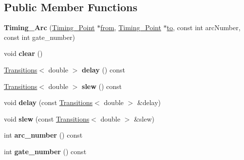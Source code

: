\subsection*{Public Member Functions}
\begin{DoxyCompactItemize}
\item 
\hypertarget{classTiming__Analysis_1_1Timing__Arc_a38312efc7070c651743a667568514162}{{\bfseries Timing\-\_\-\-Arc} (\hyperlink{classTiming__Analysis_1_1Timing__Point}{Timing\-\_\-\-Point} $\ast$\hyperlink{classTiming__Analysis_1_1Edge_a47020ea89fd9fde438adc814a731a23d}{from}, \hyperlink{classTiming__Analysis_1_1Timing__Point}{Timing\-\_\-\-Point} $\ast$\hyperlink{classTiming__Analysis_1_1Single__Fanout__Edge_ac01deccce158b6cee6883924e6dcb788}{to}, const int arc\-Number, const int gate\-\_\-number)}\label{classTiming__Analysis_1_1Timing__Arc_a38312efc7070c651743a667568514162}

\item 
\hypertarget{classTiming__Analysis_1_1Timing__Arc_a092de659dd0846a3e899f0efd9c34397}{void {\bfseries clear} ()}\label{classTiming__Analysis_1_1Timing__Arc_a092de659dd0846a3e899f0efd9c34397}

\item 
\hypertarget{classTiming__Analysis_1_1Timing__Arc_a6561e6eb77cc7536f5515db318b233ce}{\hyperlink{classTransitions}{Transitions}$<$ double $>$ {\bfseries delay} () const }\label{classTiming__Analysis_1_1Timing__Arc_a6561e6eb77cc7536f5515db318b233ce}

\item 
\hypertarget{classTiming__Analysis_1_1Timing__Arc_a9846eb6bd9afc2cd8cbb0f926daf39a5}{\hyperlink{classTransitions}{Transitions}$<$ double $>$ {\bfseries slew} () const }\label{classTiming__Analysis_1_1Timing__Arc_a9846eb6bd9afc2cd8cbb0f926daf39a5}

\item 
\hypertarget{classTiming__Analysis_1_1Timing__Arc_a74682f1b90b14cb0902dca32e6430fd2}{void {\bfseries delay} (const \hyperlink{classTransitions}{Transitions}$<$ double $>$ \&delay)}\label{classTiming__Analysis_1_1Timing__Arc_a74682f1b90b14cb0902dca32e6430fd2}

\item 
\hypertarget{classTiming__Analysis_1_1Timing__Arc_a5521ea0890331cb77e6b0ea72a7062a3}{void {\bfseries slew} (const \hyperlink{classTransitions}{Transitions}$<$ double $>$ \&slew)}\label{classTiming__Analysis_1_1Timing__Arc_a5521ea0890331cb77e6b0ea72a7062a3}

\item 
\hypertarget{classTiming__Analysis_1_1Timing__Arc_aa4a54ed3cd6762bd26a3fdf566b5a234}{int {\bfseries arc\-\_\-number} () const }\label{classTiming__Analysis_1_1Timing__Arc_aa4a54ed3cd6762bd26a3fdf566b5a234}

\item 
\hypertarget{classTiming__Analysis_1_1Timing__Arc_abd085ce8fe10d00d6e0be2668773b32f}{int {\bfseries gate\-\_\-number} () const }\label{classTiming__Analysis_1_1Timing__Arc_abd085ce8fe10d00d6e0be2668773b32f}

\end{DoxyCompactItemize}
